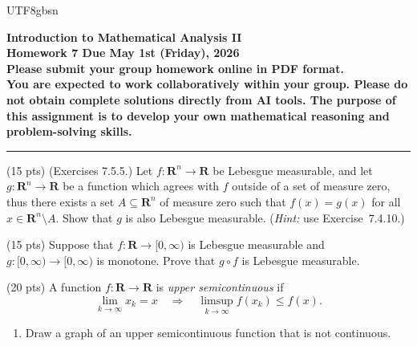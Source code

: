 \documentclass[addpoints]{exam}
\theoremstyle{definition}
\begin{document}
\begin{CJK*}{UTF8}{gbsn}
\begin{center}
    {\Large{\bf Introduction to Mathematical Analysis II\\
    Homework 7  Due  May 1st (Friday), 2026\\
    Please submit your group homework online in PDF format.\\
You are expected to work collaboratively within your group. 
Please do not obtain complete solutions directly from AI tools. 
The purpose of this assignment is to develop your own mathematical reasoning and problem-solving skills. %
  }} \\ 
    \large
\end{center}

\noindent\rule{16.2cm}{0.4pt}


\begin{questions}


\question  (15 pts)  (Exercises 7.5.5.)
Let $f:\mathbf{R}^n\to\mathbf{R}$ be Lebesgue measurable, and let $g:\mathbf{R}^n\to\mathbf{R}$
be a function which agrees with $f$ outside of a set of measure zero, thus there exists a set
$A\subseteq\mathbf{R}^n$ of measure zero such that $f(x)=g(x)$ for all $x\in\mathbf{R}^n\setminus A$.
Show that $g$ is also Lebesgue measurable.
(\emph{Hint:} use Exercise~7.4.10.)

\begin{solution}
\end{solution}

\question (15 pts) 
Suppose that \(f:\mathbf{R}\to [0,\infty)\) is Lebesgue measurable and
\(g:[0,\infty)\to [0,\infty)\) is monotone. Prove that
\(g\circ f\) is Lebesgue measurable.



\begin{solution}


\end{solution}



\question (20 pts) A function \(f:\mathbf{R}\to \mathbf{R}\) is \emph{upper semicontinuous} if
\[
\lim_{k\to\infty} x_k=x
\quad\Longrightarrow\quad
\limsup_{k\to\infty} f(x_k)\le f(x).
\]


\begin{enumerate}
    \item[(a)] Draw a graph of an upper semicontinuous function that is not continuous.
    

\end{enumerate}
\end{questions}
\end{CJK*}
\end{document}
